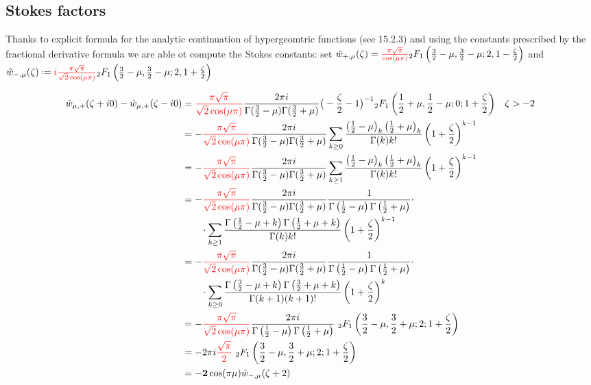 \documentclass{article}
\begin{document}
\subsection{Stokes factors}

Thanks to explicit formula for the analytic continuation of hypergeomtric functions (see \cite{dlmf} 15.2.3) and using the constants prescribed by the fractional derivative formula we are able ot compute the Stokes constants: set $\hat{w}_{+,\mu}(\zeta)=\textcolor{red}{\frac{\pi\sqrt{\pi}}{\cos(\mu \pi)}} {}_2F_1\left(\tfrac{3}{2}-\mu,\tfrac{3}{2}-\mu;2,1-\tfrac{\zeta}{2}\right)$ and $\hat{w}_{-,\mu}(\zeta)\defeq \textcolor{red}{i\tfrac{\pi\sqrt{\pi}}{\sqrt{2}\cos(\mu \pi)}} {}_2F_1\left(\tfrac{3}{2}-\mu,\tfrac{3}{2}-\mu;2,1+\tfrac{\zeta}{2}\right)$

\begin{align*}
\hat{w}_{\mu,+}(\zeta+i0)-\hat{w}_{\mu,+}(\zeta-i0)&=\textcolor{red}{\frac{\pi\sqrt{\pi}}{\sqrt{2}\cos(\mu \pi)}}\frac{2\pi i}{\Gamma(\tfrac{3}{2}-\mu)\Gamma(\tfrac{3}{2}+\mu)}\big(-\frac{\zeta}{2}-1\big)^{-1}{}_2F_1\left(\frac{1}{2}+\mu,\frac{1}{2}-\mu;0;1+\frac{\zeta}{2}\right) & \zeta>-2 \\
&=-\textcolor{red}{\frac{\pi\sqrt{\pi}}{\sqrt{2}\cos(\mu \pi)}}\frac{2\pi i}{\Gamma(\tfrac{3}{2}-\mu)\Gamma(\tfrac{3}{2}+\mu)}\sum_{k\geq 0}\frac{\left(\tfrac{1}{2}-\mu\right)_k\left(\tfrac{1}{2}+\mu\right)_k}{\Gamma(k)k!}\left(1+\frac{\zeta}{2}\right)^{k-1} & \\
&=-\textcolor{red}{\frac{\pi\sqrt{\pi}}{\sqrt{2}\cos(\mu \pi)}}\frac{2\pi i}{\Gamma(\tfrac{3}{2}-\mu)\Gamma(\tfrac{3}{2}+\mu)}\sum_{k\geq 1}\frac{\left(\tfrac{1}{2}-\mu\right)_k\left(\tfrac{1}{2}+\mu\right)_k}{\Gamma(k)k!}\left(1+\frac{\zeta}{2}\right)^{k-1} & \\
&=-\textcolor{red}{\frac{\pi\sqrt{\pi}}{\sqrt{2}\cos(\mu \pi)}}\frac{2\pi i}{\Gamma(\tfrac{3}{2}-\mu)\Gamma(\tfrac{3}{2}+\mu)}\frac{1}{\Gamma\left(\frac{1}{2}-\mu\right)\Gamma\left(\frac{1}{2}+\mu\right)}\cdot\\
& \qquad\cdot \sum_{k\geq 1}\frac{\Gamma\left(\tfrac{1}{2}-\mu+k\right)\Gamma\left(\tfrac{1}{2}+\mu+k\right)}{\Gamma(k)k!}\left(1+\frac{\zeta}{2}\right)^{k-1} & \\
&=-\textcolor{red}{\frac{\pi\sqrt{\pi}}{\sqrt{2}\cos(\mu \pi)}}\frac{2\pi i}{\Gamma(\tfrac{3}{2}-\mu)\Gamma(\tfrac{3}{2}+\mu)}\frac{1}{\Gamma\left(\frac{1}{2}-\mu\right)\Gamma\left(\frac{1}{2}+\mu\right)}\cdot \\
&\qquad\cdot \sum_{k\geq 0}\frac{\Gamma\left(\tfrac{3}{2}-\mu+k\right)\Gamma\left(\tfrac{3}{2}+\mu+k\right)}{\Gamma(k+1)(k+1)!}\left(1+\frac{\zeta}{2}\right)^{k} & \\
&=-\textcolor{red}{\frac{\pi\sqrt{\pi}}{\sqrt{2}\cos(\mu \pi)}}\frac{2\pi i}{\Gamma\left(\frac{1}{2}-\mu\right)\Gamma\left(\frac{1}{2}+\mu\right)}\,\, {}_2F_1\left(\frac{3}{2}-\mu,\frac{3}{2}+\mu;2;1+\frac{\zeta}{2}\right) & \\
&=-2\pi i\textcolor{red}{\frac{\sqrt{\pi}}{2}}\,\, {}_2F_1\left(\frac{3}{2}-\mu,\frac{3}{2}+\mu;2;1+\frac{\zeta}{2}\right)\\
&=\mathbf{-2}\cos(\pi\mu)\hat{w}_{-,\mu}(\zeta+2)
\end{align*} 
\end{document}
